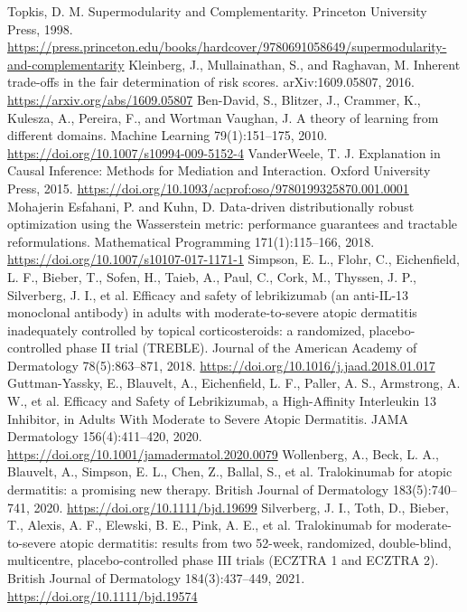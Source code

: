 ﻿%
\begin{thebibliography}{99}
 Topkis, D. M. Supermodularity and Complementarity. Princeton University Press, 1998. \url{https://press.princeton.edu/books/hardcover/9780691058649/supermodularity-and-complementarity}
 Kleinberg, J., Mullainathan, S., and Raghavan, M. Inherent trade-offs in the fair determination of risk scores. arXiv:1609.05807, 2016. \url{https://arxiv.org/abs/1609.05807}
 Ben-David, S., Blitzer, J., Crammer, K., Kulesza, A., Pereira, F., and Wortman Vaughan, J. A theory of learning from different domains. Machine Learning 79(1):151--175, 2010. \url{https://doi.org/10.1007/s10994-009-5152-4}
 VanderWeele, T. J. Explanation in Causal Inference: Methods for Mediation and Interaction. Oxford University Press, 2015. \url{https://doi.org/10.1093/acprof:oso/9780199325870.001.0001}
 Mohajerin Esfahani, P. and Kuhn, D. Data-driven distributionally robust optimization using the Wasserstein metric: performance guarantees and tractable reformulations. Mathematical Programming 171(1):115--166, 2018. \url{https://doi.org/10.1007/s10107-017-1171-1}
 Simpson, E. L., Flohr, C., Eichenfield, L. F., Bieber, T., Sofen, H., Taieb, A., Paul, C., Cork, M., Thyssen, J. P., Silverberg, J. I., et al. Efficacy and safety of lebrikizumab (an anti-IL-13 monoclonal antibody) in adults with moderate-to-severe atopic dermatitis inadequately controlled by topical corticosteroids: a randomized, placebo-controlled phase II trial (TREBLE). Journal of the American Academy of Dermatology 78(5):863--871, 2018. \url{https://doi.org/10.1016/j.jaad.2018.01.017}
 Guttman-Yassky, E., Blauvelt, A., Eichenfield, L. F., Paller, A. S., Armstrong, A. W., et al. Efficacy and Safety of Lebrikizumab, a High-Affinity Interleukin 13 Inhibitor, in Adults With Moderate to Severe Atopic Dermatitis. JAMA Dermatology 156(4):411--420, 2020. \url{https://doi.org/10.1001/jamadermatol.2020.0079}
 Wollenberg, A., Beck, L. A., Blauvelt, A., Simpson, E. L., Chen, Z., Ballal, S., et al. Tralokinumab for atopic dermatitis: a promising new therapy. British Journal of Dermatology 183(5):740--741, 2020. \url{https://doi.org/10.1111/bjd.19699}
 Silverberg, J. I., Toth, D., Bieber, T., Alexis, A. F., Elewski, B. E., Pink, A. E., et al. Tralokinumab for moderate-to-severe atopic dermatitis: results from two 52-week, randomized, double-blind, multicentre, placebo-controlled phase III trials (ECZTRA 1 and ECZTRA 2). British Journal of Dermatology 184(3):437--449, 2021. \url{https://doi.org/10.1111/bjd.19574}

\end{thebibliography}

